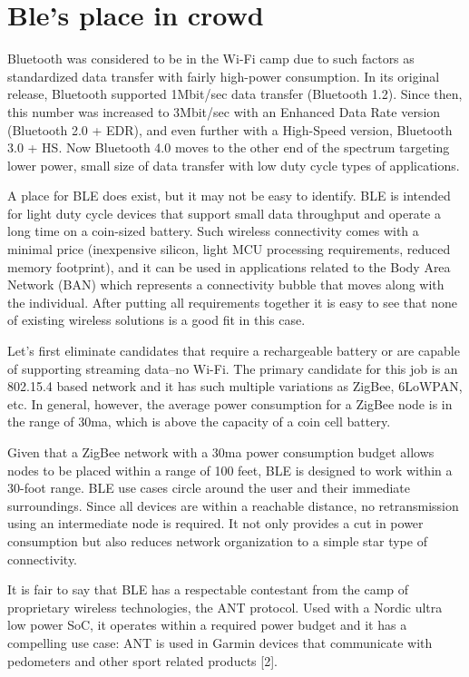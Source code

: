 \documentclass[11pt,a4paper]{article}
\begin{document}
	\newpage
	\section{Ble's place in crowd}
	{
	Bluetooth was considered to be in the Wi-Fi camp due to such factors as standardized data transfer with fairly high-power consumption. In its original release, Bluetooth supported 1Mbit/sec data transfer (Bluetooth 1.2). Since then, this number was increased to 3Mbit/sec with an Enhanced Data Rate version (Bluetooth 2.0 + EDR), and even further with a High-Speed version, Bluetooth 3.0 + HS. Now Bluetooth 4.0 moves to the other end of the spectrum targeting lower power, small size of data transfer with low duty cycle types of applications.

A place for BLE does exist, but it may not be easy to identify. BLE is intended for light duty cycle devices that support small data throughput and operate a long time on a coin-sized battery. Such wireless connectivity comes with a minimal price (inexpensive silicon, light MCU processing requirements, reduced memory footprint), and it can be used in applications related to the Body Area Network (BAN) which represents a connectivity bubble that moves along with the individual.  After putting all requirements together it is easy to see that none of existing wireless solutions is a good fit in this case.

Let's first eliminate candidates that require a rechargeable battery or are capable of supporting streaming data--no Wi-Fi. The primary candidate for this job is an 802.15.4 based network and it has such multiple variations as ZigBee, 6LoWPAN, etc. In general, however, the average power consumption for a ZigBee node is in the range of 30ma, which is above the capacity of a coin cell battery.

 

Given that a ZigBee network with a 30ma power consumption budget allows nodes to be placed within a range of 100 feet, BLE is designed to work within a 30-foot range. BLE use cases circle around the user and their immediate surroundings. Since all devices are within a reachable distance, no retransmission using an intermediate node is required. It not only provides a cut in power consumption but also reduces network organization to a simple star type of connectivity.

 

It is fair to say that BLE has a respectable contestant from the camp of proprietary wireless technologies, the ANT protocol. Used with a Nordic ultra low power SoC, it operates within a required power budget and it has a compelling use case: ANT is used in Garmin devices that communicate with pedometers and other sport related products [2].

}
\end{document}
